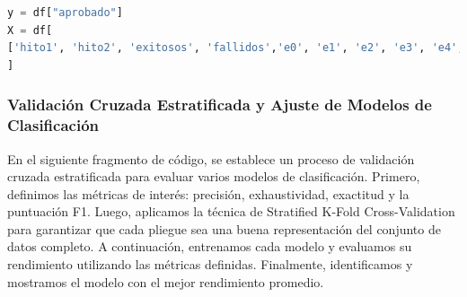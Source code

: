 \begin{lstlisting}[language=Python, caption=Selección de características y variable objetivo, label=lst:seleccion_caracteristicas]
y = df["aprobado"]
X = df[
['hito1', 'hito2', 'exitosos', 'fallidos','e0', 'e1', 'e2', 'e3', 'e4', 'e5', 'e6', 'e7', 'e8', 'e9', 'e10', 'e11', 'e12', 'e13', 'e14', 'e15', 'e16', 'e17', 'e18', 'e19', 'e20', 'e21', 'e22', 'e23', 'e24', 'e25', 'e26', 'e27', 'e28', 'e29', 'e30', 'e31', 'e32', 'e33', 'e34', 'e35', 'e36', 'e37', 'e38', 'e39', 'e40', 'e41', 'e42', 'e43', 'e44', 'e45', 'e46', 'e47', 'e48', 'e49', 'e50', 'e51', 'e52']
]
\end{lstlisting}


\subsubsection{Validación Cruzada Estratificada y Ajuste de Modelos de Clasificación}

En el siguiente fragmento de código, se establece un proceso de validación cruzada estratificada para evaluar varios modelos de clasificación. Primero, definimos las métricas de interés: precisión, exhaustividad, exactitud y la puntuación F1. Luego, aplicamos la técnica de Stratified K-Fold Cross-Validation para garantizar que cada pliegue sea una buena representación del conjunto de datos completo. A continuación, entrenamos cada modelo y evaluamos su rendimiento utilizando las métricas definidas. Finalmente, identificamos y mostramos el modelo con el mejor rendimiento promedio.

